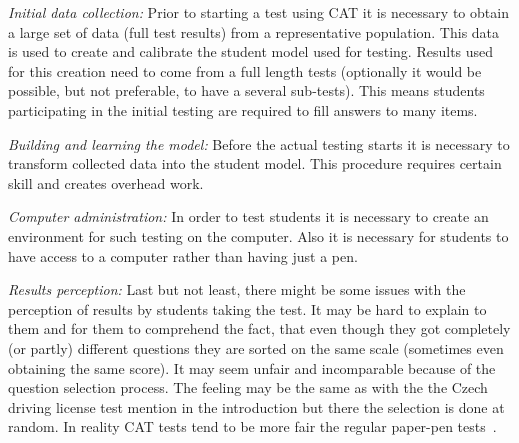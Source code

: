 \emph{Initial data collection:} Prior to starting a test using CAT it is necessary to obtain a large set of data (full test results) from a representative population. This data is used to create and calibrate the student model used for testing. Results used for this creation need to come from a full length tests (optionally it would be possible, but not preferable, to have a several sub-tests). This means students participating in the initial testing are required to fill answers to many items.

\emph{Building and learning the model: }Before the actual testing starts it is necessary to transform collected data into the student model. This procedure requires certain skill and creates overhead work. 

\emph{Computer administration:} In order to test students it is necessary to create an environment for such testing on the computer. Also it is necessary for students to have access to a computer rather than having just a pen.

\emph{Results perception:} Last but not least, there might be some issues with the perception of results by students taking the test. It may be hard to explain to them and for them to comprehend the fact, that even though they got completely (or partly) different questions they are sorted on the same scale (sometimes even obtaining the same score). It may seem unfair and incomparable because of the question selection process. The feeling may be the same as with the the Czech driving license test mention in the introduction but there the selection is done at random. In reality CAT tests tend to be more fair the regular paper-pen tests~\cite{Moe1988, Tonidandel2002}.
